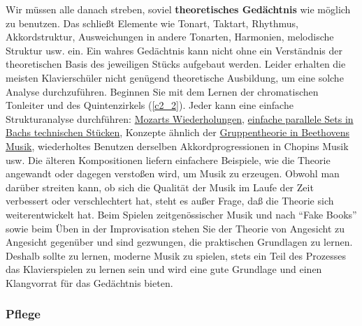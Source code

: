 \label{c1iii6theorie}

Wir müssen alle danach streben, soviel \textbf{theoretisches Gedächtnis} wie möglich zu benutzen.
Das schließt Elemente wie Tonart, Taktart, Rhythmus, Akkordstruktur, Ausweichungen in andere Tonarten, Harmonien, melodische Struktur usw. ein.
Ein wahres Gedächtnis kann nicht ohne ein Verständnis der theoretischen Basis des jeweiligen Stücks aufgebaut werden. 
Leider erhalten die meisten Klavierschüler nicht genügend theoretische Ausbildung, um eine solche Analyse durchzuführen.
Beginnen Sie mit dem Lernen der chromatischen Tonleiter und des Quintenzirkels (\hyperref[c2_2]{\autoref{c2_2}}).
Jeder kann eine einfache Strukturanalyse durchführen: \hyperref[c1iv4]{Mozarts Wiederholungen}, \hyperref[c1iii20]{einfache parallele Sets in Bachs technischen Stücken}, Konzepte ähnlich der \hyperref[c1iv4Gruppe]{Gruppentheorie in Beethovens Musik}, wiederholtes Benutzen derselben Akkordprogressionen in Chopins Musik usw.
Die älteren Kompositionen liefern einfachere Beispiele, wie die Theorie angewandt oder dagegen verstoßen wird, um Musik zu erzeugen.
Obwohl man darüber streiten kann, ob sich die Qualität der Musik im Laufe der Zeit verbessert oder verschlechtert hat, steht es außer Frage, daß die Theorie sich weiterentwickelt hat.
Beim Spielen zeitgenössischer Musik und nach \enquote{Fake Books} sowie beim Üben in der Improvisation stehen Sie der Theorie von Angesicht zu Angesicht gegenüber und sind gezwungen, die praktischen Grundlagen zu lernen.
Deshalb sollte zu lernen, moderne Musik zu spielen, stets ein Teil des Prozesses das Klavierspielen zu lernen sein und wird eine gute Grundlage und einen Klangvorrat für das Gedächtnis bieten.


\subsubsection{Pflege}
\label{c1iii6k}

